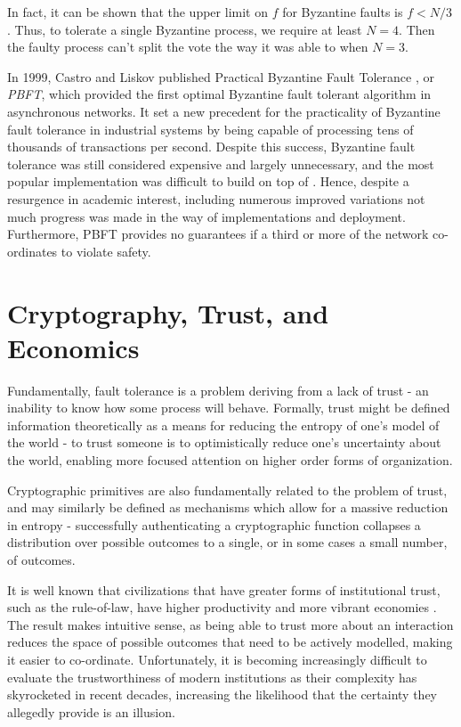 In fact, it can be shown that the upper limit on $f$ for Byzantine faults is $f < N/3$ \cite{pease1980reaching}.
Thus, to tolerate a single Byzantine process, we require at least $N=4$. 
Then the faulty process can't split the vote the way it was able to when $N=3$.

In 1999, Castro and Liskov published Practical Byzantine Fault Tolerance \cite{pbft}, or \emph{PBFT}, 
which provided the first optimal Byzantine fault tolerant algorithm in asynchronous networks.
It set a new precedent for the practicality of Byzantine fault tolerance in industrial systems by being capable 
of processing tens of thousands of transactions per second.
Despite this success, Byzantine fault tolerance was still considered expensive and largely unnecessary, 
and the most popular implementation was difficult to build on top of \cite{ppbft}.
Hence, despite a resurgence in academic interest, including numerous improved variations \cite{yin2003separating, kotla2007zyzzyva}
not much progress was made in the way of implementations and deployment.
Furthermore, PBFT provides no guarantees if a third or more of the network co-ordinates to violate safety.

\section{Cryptography, Trust, and Economics}

Fundamentally, fault tolerance is a problem deriving from a lack of trust - 
an inability to know how some process will behave.
Formally, trust might be defined information theoretically as a means
for reducing the entropy of one's model of the world - 
to trust someone is to optimistically reduce one's uncertainty about the world,
enabling more focused attention on higher order forms of organization.

Cryptographic primitives are also fundamentally related to the problem of trust,
and may similarly be defined as mechanisms which allow for a massive reduction in entropy -
successfully authenticating a cryptographic function collapses a distribution 
over possible outcomes to a single, or in some cases a small number, of outcomes.

It is well known that civilizations that have greater forms of institutional trust,
such as the rule-of-law, 
have higher productivity and more vibrant economies \cite{zak2001trust}.
The result makes intuitive sense, as being able to trust more about an interaction 
reduces the space of possible outcomes that need to be actively modelled,
making it easier to co-ordinate.
Unfortunately, it is becoming increasingly difficult to evaluate the trustworthiness 
of modern institutions as their complexity has skyrocketed in recent decades,
increasing the likelihood that the certainty they allegedly provide is an illusion.

